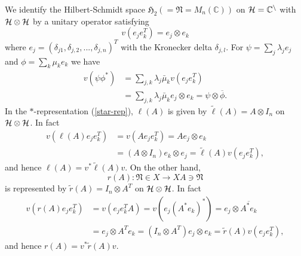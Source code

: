 \documentclass{article}
\begin{document}
 We identify the Hilbert-Schmidt space $\mathfrak{H}_2(=\mathfrak{N}=M_n(\mathbb{C}))$ on $\cal{H}=\mathbb{C}^n$ with $\cal{H}\otimes\cal{H}$
by a unitary operator satisfying 
$$
v(e_je_k^T)=e_j\otimes e_k
$$
where $e_j=(\delta_{j1},\delta_{j,2},...,\delta_{j,n})^T$ with the Kronecker delta $\delta_{j,l}$. 
For $\psi=\sum_j \lambda_j e_j$ and $\phi=\sum_k \mu_k e_k$
we have
\begin{equation}
\begin{split}
v(\psi\phi^\ast)&=\sum_{j,k}\lambda_j\bar{\mu}_k v(e_je_k^T)\\
&=\sum_{j,k}\lambda_j\bar{\mu}_k e_j\otimes e_k={\psi}\otimes \overline{\phi}.
\end{split}
\end{equation}
In the $\ast$-representation (\ref{star-rep}), $\ell(A)$ is given by $\tilde{\ell}(A)=A\otimes I_n$ on $\cal{H}\otimes\cal{H}$.
In fact
 \begin{equation}
 \begin{split}
 v(\ell(A)e_je_k^T)&=v(Ae_je_k^T)=Ae_j\otimes e_k\\
 &= (A\otimes I_n)e_k\otimes  e_j=\tilde{\ell}(A)v(e_je_k^T),
 \end{split} 
 \end{equation}
 and hence $\ell(A)=v^{\ast}\tilde{\ell}(A)v$. 
On the other hand, 
$$
r(A):\mathfrak{N}\in X \to XA\ni\mathfrak{N}
$$ 
is represented by $\tilde{r}(A)=I_n\otimes A^T$ on $\cal{H}\otimes\cal{H}$.
In fact
 \begin{equation}
 \begin{split}
 v(r(A)e_je_k^T)&=v(e_je_k^TA)=v(e_j(A^\ast e_k)^\ast)=e_j\otimes \overline{A^\ast e_k}\\
 &= e_j \otimes A^T e_k= (I_n\otimes A^T)e_j\otimes  e_k=\tilde{r}(A)v(e_je_k^T),
 \end{split} 
 \end{equation}
 and hence $r(A)=v^{\ast}\tilde{r}(A) v$. 
\end{document}
